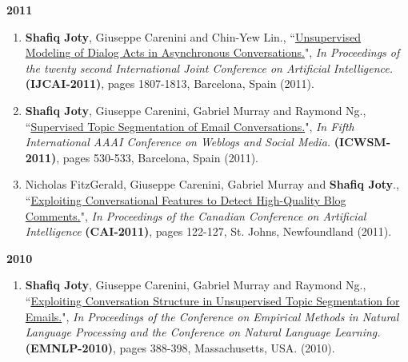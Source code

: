 \documentclass[paper=letter,fontsize=11pt]{scrartcl} %
\newcommand{\PaperEntry}[7]{
		\noindent #1, ``\href{#7}{#2}", \textit{#3} \textbf{#4}, #5 (#6).}
\begin{document}
\Large \textbf{2011} \normalsize
\begin{enumerate}

\item \PaperEntry{\textbf{Shafiq Joty}, Giuseppe Carenini and Chin-Yew Lin.}{Unsupervised Modeling of Dialog Acts in Asynchronous Conversations.}{In Proceedings of the twenty second International Joint Conference on Artificial Intelligence.} {(IJCAI-2011)}{pages 1807-1813, Barcelona, Spain}{2011}
{http://dl.acm.org/citation.cfm?id=2283705}

\item \PaperEntry{\textbf{Shafiq Joty}, Giuseppe Carenini, Gabriel Murray and Raymond Ng.}{Supervised Topic Segmentation of Email Conversations.}{In Fifth International AAAI Conference on Weblogs and Social Media.} {(ICWSM-2011)}{pages 530-533, Barcelona, Spain}{2011}
{https://www.aaai.org/ocs/index.php/ICWSM/ICWSM11/paper/viewFile/2882/3228}

\item \PaperEntry{Nicholas FitzGerald, Giuseppe Carenini, Gabriel Murray and \textbf{Shafiq Joty}.}{Exploiting Conversational Features to Detect High-Quality Blog Comments.}{In Proceedings of the Canadian Conference on Artificial Intelligence} {(CAI-2011)}{pages 122-127, St. Johns, Newfoundland}{2011}
{http://link.springer.com/chapter/10.1007/978-3-642-21043-3_15}
\end{enumerate}

\Large \textbf{2010} \normalsize
\begin{enumerate}
\item \PaperEntry{\textbf{Shafiq Joty}, Giuseppe Carenini, Gabriel Murray and Raymond Ng.}{Exploiting Conversation Structure in Unsupervised Topic Segmentation for Emails.}{In Proceedings of the Conference on Empirical Methods in Natural Language Processing and the Conference on Natural Language Learning.} {(EMNLP-2010)}{pages 388-398, Massachusetts, USA.}{2010}
{https://www.aclweb.org/anthology/D/D10/D10-1038.pdf}
\end{enumerate}
\end{document}
